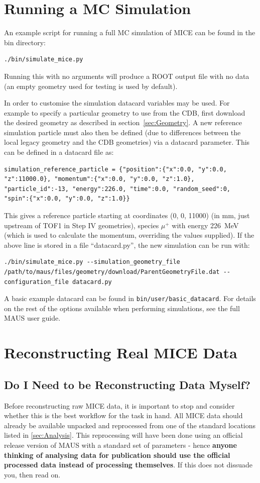 \documentclass[a4paper,10pt]{article}
\begin{document}
\section{Running a MC Simulation}
\label{sec:Simulation}
  An example script for running a full MC simulation of MICE can be found in the bin directory:
  \begin{lstlisting}
./bin/simulate_mice.py 
  \end{lstlisting}
  Running this with no arguments will produce a ROOT output file with no data (an empty geometry used for testing is used by default). 

  In order to customise the simulation datacard variables may be used. For example to specify a particular geometry to use from the CDB, first download the desired geometry as described in section~\ref{sec:Geometry}. A new reference simulation particle must also then be defined (due to differences between the local legacy geometry and the CDB geometries) via a datacard parameter. This can be defined in a datacard file as:
  \begin{lstlisting}
simulation_reference_particle = {"position":{"x":0.0, "y":0.0, "z":11000.0}, "momentum":{"x":0.0, "y":0.0, "z":1.0}, "particle_id":-13, "energy":226.0, "time":0.0, "random_seed":0, "spin":{"x":0.0, "y":0.0, "z":1.0}}
  \end{lstlisting}
  This gives a reference particle starting at coordinates (0, 0, 11000) (in mm, just upstream of TOF1 in Step IV geometries), species $\mu^+$ with energy 226~MeV (which is used to calculate the momentum, overriding the values supplied). If the above line is stored in a file ``datacard.py'', the new simulation can be run with:
  \begin{lstlisting}
./bin/simulate_mice.py --simulation_geometry_file /path/to/maus/files/geometry/download/ParentGeometryFile.dat --configuration_file datacard.py 
  \end{lstlisting}
  A basic example datacard can be found in \texttt{bin/user/basic\_datacard}. For details on the rest of the options available when performing simulations, see the full MAUS user guide.

\section{Reconstructing Real MICE Data}
\label{sec:Reconstruction}

  \subsection{Do I Need to be Reconstructing Data Myself?}
  Before reconstructing raw MICE data, it is important to stop and consider whether this is the best workflow for the task in hand. All MICE data should already be available unpacked and reprocessed from one of the standard locations listed in \ref{sec:Analysis}. This reprocessing will have been done using an official release version of MAUS with a standard set of parameters - hence \textbf{anyone thinking of analysing data for publication should use the official processed data instead of processing themselves}. If this does not dissuade you, then read on.
\end{document}
